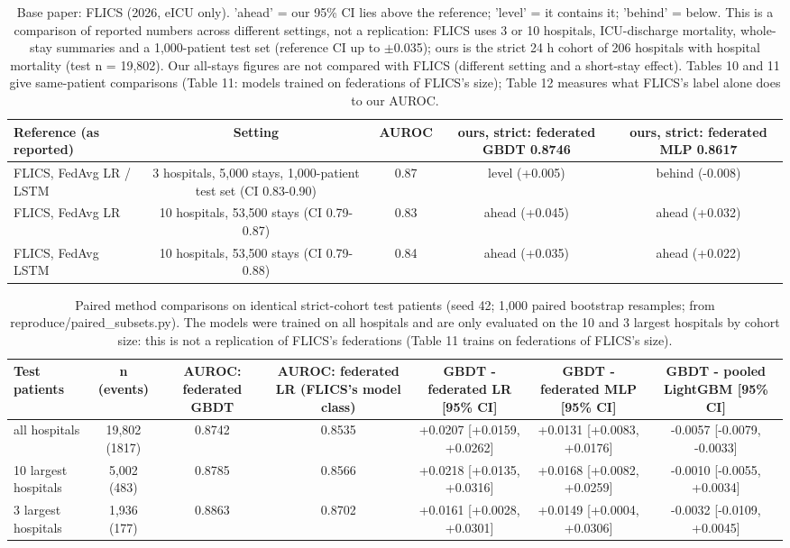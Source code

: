 \begin{table}[t]
\centering\small
\caption{Base paper: FLICS (2026, eICU only). 'ahead' = our 95\% CI lies above the reference; 'level' = it contains it; 'behind' = below. This is a comparison of reported numbers across different settings, not a replication: FLICS uses 3 or 10 hospitals, ICU-discharge mortality, whole-stay summaries and a 1,000-patient test set (reference CI up to $\pm$0.035); ours is the strict 24 h cohort of 206 hospitals with hospital mortality (test n = 19,802). Our all-stays figures are not compared with FLICS (different setting and a short-stay effect). Tables 10 and 11 give same-patient comparisons (Table 11: models trained on federations of FLICS's size); Table 12 measures what FLICS's label alone does to our AUROC.}\label{tab:flics}
\begin{tabular}{lcccc}
\toprule
Reference (as reported) & Setting & AUROC & ours, strict: federated GBDT 0.8746 & ours, strict: federated MLP 0.8617 \\
\midrule
FLICS, FedAvg LR / LSTM & 3 hospitals, 5,000 stays, 1,000-patient test set (CI 0.83-0.90) & 0.87 & level (+0.005) & behind (-0.008) \\
FLICS, FedAvg LR & 10 hospitals, 53,500 stays (CI 0.79-0.87) & 0.83 & ahead (+0.045) & ahead (+0.032) \\
FLICS, FedAvg LSTM & 10 hospitals, 53,500 stays (CI 0.79-0.88) & 0.84 & ahead (+0.035) & ahead (+0.022) \\
\bottomrule
\end{tabular}
\end{table}

\begin{table}[t]
\centering\small
\caption{Paired method comparisons on identical strict-cohort test patients (seed 42; 1,000 paired bootstrap resamples; from reproduce/paired\_subsets.py). The models were trained on all hospitals and are only evaluated on the 10 and 3 largest hospitals by cohort size: this is not a replication of FLICS's federations (Table 11 trains on federations of FLICS's size).}\label{tab:paired}
\begin{tabular}{lcccccc}
\toprule
Test patients & n (events) & AUROC: federated GBDT & AUROC: federated LR (FLICS's model class) & GBDT - federated LR [95\% CI] & GBDT - federated MLP [95\% CI] & GBDT - pooled LightGBM [95\% CI] \\
\midrule
all hospitals & 19,802 (1817) & 0.8742 & 0.8535 & +0.0207 [+0.0159, +0.0262] & +0.0131 [+0.0083, +0.0176] & -0.0057 [-0.0079, -0.0033] \\
10 largest hospitals & 5,002 (483) & 0.8785 & 0.8566 & +0.0218 [+0.0135, +0.0316] & +0.0168 [+0.0082, +0.0259] & -0.0010 [-0.0055, +0.0034] \\
3 largest hospitals & 1,936 (177) & 0.8863 & 0.8702 & +0.0161 [+0.0028, +0.0301] & +0.0149 [+0.0004, +0.0306] & -0.0032 [-0.0109, +0.0045] \\
\bottomrule
\end{tabular}
\end{table}

